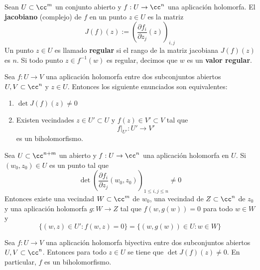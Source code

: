 \begin{definition}\label{puntoregular}
	Sean $U\subset \cc^m$ un conjunto abierto y $f:U\to\cc^n$ una aplicación holomorfa. El \textbf{jacobiano} (complejo) de $f$ en un punto $z\in U$ es la matriz 
	\begin{equation*}
		J(f)(z):=\left(\frac{\partial f_i}{\partial z_j}(z) \right)_{i,j}
	\end{equation*}
	Un punto $z\in U$ es llamado \textbf{regular} si el rango de la matriz jacobiana $J(f)(z)$ es $n$. Si todo punto $z\in f^{-1}(w)$ es regular, decimos que $w$ es un \textbf{valor regular}.
\end{definition}



\begin{theorem}
	Sea $f:U\to V$ una aplicación holomorfa entre dos subconjuntos abiertos $U,V\subset \cc^n$ y $z\in U$. Entonces los siguiente enunciados son equivalentes:
	\begin{enumerate}
		\item $\det J(f)(z)\neq 0$
		\item Existen vecindades $z\in U'\subset U$ y $f(z)\in V'\subset V$ tal que 
		\begin{equation*}
			f\left.\right|_{U'}:U'\to V'
		\end{equation*}
		es un biholomorfismo.
	\end{enumerate}
\end{theorem}

\begin{theorem}\label{funcionimplicita}
	Sea $U\subset\cc^{n+m}$ un abierto y $f:U\to \cc^n$ una aplicación holomorfa en $U$. Si $(w_0,z_0)\in U$ es un punto tal que
	$$ \det\left(\frac{\partial f_i}{\partial z_j}(w_0,z_0)\right)_{1\leq i,j \leq n}\neq 0$$
	Entonces existe una vecindad $W\subset \cc^m$ de $w_0$, una vecindad de $Z\subset\cc^n$ de $z_0$ y una aplicación holomorfa $g:W\to Z$ tal que $f(w,g(w))=0$ para todo $w\in W$ y
	\begin{equation*}
		\{(w,z)\in U':f(w,z)=0\}=\{(w,g(w))\in U:w\in W\}
	\end{equation*}
\end{theorem}



\begin{propo}\label{biholomorfismojac}
	Sea $f:U\to V$ una aplicación holomorfa biyectiva entre dos subconjuntos abiertos $U,V\subset \cc^n$. Entonces para todo $z\in U$ se tiene que $\det J(f)(z)\neq 0$. En particular, $f$ es un biholomorfismo.
\end{propo}

